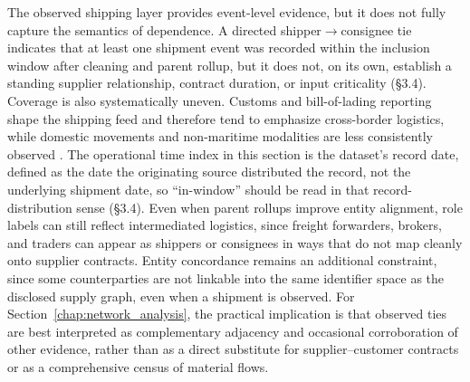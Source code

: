 The observed shipping layer provides event-level evidence, but it does not fully capture the semantics of dependence. A directed shipper$\rightarrow$consignee tie indicates that at least one shipment event was recorded within the inclusion window after cleaning and parent rollup, but it does not, on its own, establish a standing supplier relationship, contract duration, or input criticality (\S3.4). Coverage is also systematically uneven. Customs and bill-of-lading reporting shape the shipping feed and therefore tend to emphasize cross-border logistics, while domestic movements and non-maritime modalities are less consistently observed \parencite{factset_factset_2025}. The operational time index in this section is the dataset's record date, defined as the date the originating source distributed the record, not the underlying shipment date, so ``in-window'' should be read in that record-distribution sense (\S3.4). Even when parent rollups improve entity alignment, role labels can still reflect intermediated logistics, since freight forwarders, brokers, and traders can appear as shippers or consignees in ways that do not map cleanly onto supplier contracts. Entity concordance remains an additional constraint, since some counterparties are not linkable into the same identifier space as the disclosed supply graph, even when a shipment is observed. For Section~\ref{chap:network_analysis}, the practical implication is that observed ties are best interpreted as complementary adjacency and occasional corroboration of other evidence, rather than as a direct substitute for supplier--customer contracts or as a comprehensive census of material flows.

